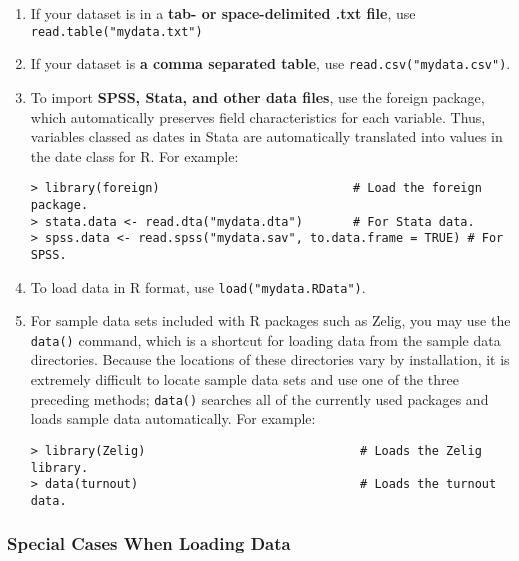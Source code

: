 \begin{enumerate}
\item If your dataset is in a \textbf{tab- or space-delimited .txt
    file}, use \texttt{read.table("mydata.txt")}
\item If your dataset is \textbf{a comma separated table}, use
  \texttt{read.csv("mydata.csv")}.
\item To import {\bf SPSS, Stata, and other data files}, use the
  foreign package, which automatically preserves field characteristics
  for each variable.  Thus, variables classed as dates in Stata are
  automatically translated into values in the date class for R.  For
  example:
\begin{verbatim}
> library(foreign)                           # Load the foreign package.  
> stata.data <- read.dta("mydata.dta")       # For Stata data.
> spss.data <- read.spss("mydata.sav", to.data.frame = TRUE) # For SPSS.
\end{verbatim}
\item To load data in R format, use {\tt load("mydata.RData")}.  
\item For sample data sets included with R packages such as Zelig, you
  may use the {\tt data()} command, which is a shortcut for loading
  data from the sample data directories.  Because the locations of
  these directories vary by installation, it is extremely difficult to
  locate sample data sets and use one of the three preceding methods;
  {\tt data()} searches all of the currently used packages and loads
  sample data automatically.  For example:
\begin{verbatim}
> library(Zelig)                              # Loads the Zelig library. 
> data(turnout)                               # Loads the turnout data.
\end{verbatim}
\end{enumerate}

\subsubsection*{Special Cases When Loading Data}

